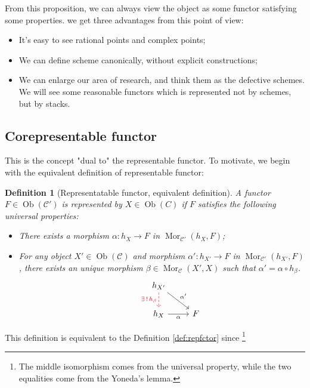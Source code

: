 \documentclass[reqno,11pt]{amsart}
\numberwithin{equation}{section}
\theoremstyle{plain}
\newtheorem{defn}[theorem]{Definition}
\theoremstyle{plain}
\numberwithin{equation}{section}
\theoremstyle{remark}
\newcommand{\Ob}{\operatorname{Ob}}
\newcommand{\Mor}{\operatorname{Mor}}
\begin{document}
From this proposition, we can always view the object as some functor satisfying some properties. we get three advantages from this point of view:
\begin{itemize}
\item It's easy to see rational points and complex points;
\item We can define scheme canonically, without explicit constructions;
\item We can enlarge our area of research, and think them as the defective schemes. We will see some reasonable functors which is represented not by schemes, but by stacks.
\end{itemize}
\subsection{Corepresentable functor}
This is the concept "dual to" the representable functor. To motivate, we begin with the equivalent definition of representable functor:
\begin{defn}[Representatable functor, equivalent definition]
A functor $F\in \Ob(\mathcal{C}')$ is represented by $X \in \Ob(C)$ if $F$ satisfies the following universal properties:
\begin{itemize}
\item There exists a morphism $\alpha:h_X \longrightarrow F$ in $\Mor_{\mathcal{C}'}(h_X,F)$;
\item For any object $X' \in \Ob(\mathcal{C})$ and morphism $\alpha':h_{X'}\longrightarrow F$ in $\Mor_{\mathcal{C}'}(h_{X'},F)$, there exists an unique morphism $\beta \in \Mor_{\mathcal{C}}(X',X)$ such that $\alpha'=\alpha \circ h_{\beta}$.
$$\begin{tikzcd}
	{} & {h_{X'}} & {} \\
	& {h_{X}} & F
	\arrow["{\exists \,! \,h_{\beta}}"', color={rgb,255:red,255;green,0;blue,8}, dashed, from=1-2, to=2-2]
	\arrow["\alpha"', from=2-2, to=2-3]
	\arrow["{\alpha'}", from=1-2, to=2-3]
\end{tikzcd}$$
\end{itemize}
\end{defn}
This definition is equivalent to the Definition \ref{def:repfctor} since \footnote{The middle isomorphism comes from the universal property, while the two equalities come from the Yoneda's lemma.}
\end{document}
